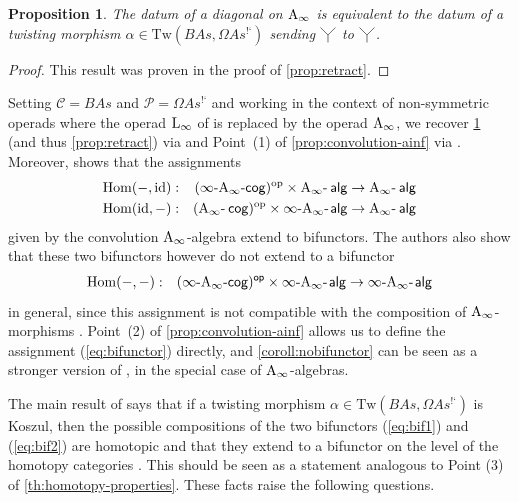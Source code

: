 \documentclass[twoside, 11pt]{amsart}
\newtheorem{proposition}[definition]{Proposition}
\theoremstyle{remark}
\begin{document}
\begin{proposition}
  \label{coroll:twisting}
  The datum of a diagonal on $\mathrm{A}_\infty$ is equivalent to the datum of a twisting morphism $\alpha \in \mathrm{Tw}(B As,\Omega As^{\text{!`}})$ sending $\premiertermecobarbarA$ to $\premiertermecobarbarA$. 
\end{proposition}

\begin{proof}
This result was proven in the proof of \cref{prop:retract}.
\end{proof}

Setting $\mathcal{C}=B As$ and $\mathcal{P}=\Omega As^{\text{!`}}$ and working in the context of non-symmetric operads where the operad $\mathrm{L}_\infty$ of \cite{RobertNicoudWierstraI,RobertNicoudWierstraII} is replaced by the operad $\mathrm{A}_\infty$, we recover \cref{coroll:twisting} (and thus \cref{prop:retract}) via \cite[Theorem 7.1]{RobertNicoudWierstraI} and Point~(1) of \cref{prop:convolution-ainf} via \cite[Theorem 4.1]{RobertNicoudWierstraI}.
Moreover, \cite[Corollary 5.4]{RobertNicoudWierstraI} shows that the assignments
\begin{eqnarray}
  \mathrm{Hom}(-,\mathrm{id}) &:& (\infty\text{-}\mathrm{A}_\infty\text{-}\mathsf{cog})^{\mathrm{op}} \times \mathrm{A}_\infty\text{-\hspace{2pt}}\mathsf{alg} \to \mathrm{A}_\infty\text{-\hspace{2pt}}\mathsf{alg} \label{eq:bif1} \\
  \mathrm{Hom}(\mathrm{id}, -) &:& (\mathrm{A}_\infty\text{-\hspace{2pt}}\mathsf{cog})^{\mathrm{op}} \times \infty\text{-}\mathrm{A}_\infty\text{-\hspace{1pt}}\mathsf{alg} \to \mathrm{A}_\infty\text{-\hspace{2pt}}\mathsf{alg} \label{eq:bif2}
\end{eqnarray}
given by the convolution $\mathrm{A}_\infty$-algebra extend to bifunctors. 
The authors also show that these two bifunctors however do not extend to a bifunctor 
\begin{eqnarray}
  \mathrm{Hom}(-,-) &:& \mathsf{(\infty\text{-}\mathrm{A}_\infty\text{-}\mathsf{cog})^{op}} \times \infty\text{-}\mathrm{A}_\infty\text{-\hspace{1pt}}\mathsf{alg} \to \infty\text{-}\mathrm{A}_\infty\text{-\hspace{1pt}}\mathsf{alg} \label{eq:bifunctor}
\end{eqnarray}
in general, since this assignment is not compatible with the composition of $\mathrm{A}_\infty$-morphisms \cite[Theorem 6.6]{RobertNicoudWierstraI}.
Point~(2) of \cref{prop:convolution-ainf} allows us to define the assignment (\ref{eq:bifunctor}) directly, and \cref{coroll:nobifunctor} can be seen as a stronger version of \cite[Theorem 6.6]{RobertNicoudWierstraI}, in the special case of $\mathrm{A}_\infty$-algebras. 

The main result of \cite{RobertNicoudWierstraII} says that if a twisting morphism $\alpha \in \mathrm{Tw}(B As,\Omega As^{\text{!`}})$ is Koszul, then the possible compositions of the two bifunctors (\ref{eq:bif1}) and (\ref{eq:bif2}) are homotopic and that they extend to a bifunctor on the level of the homotopy categories \cite[Theorem 3.6 and Corollary 3.8]{RobertNicoudWierstraII}. 
This should be seen as a statement analogous to Point (3) of \cref{th:homotopy-properties}. 
These facts raise the following questions.
\end{document}
